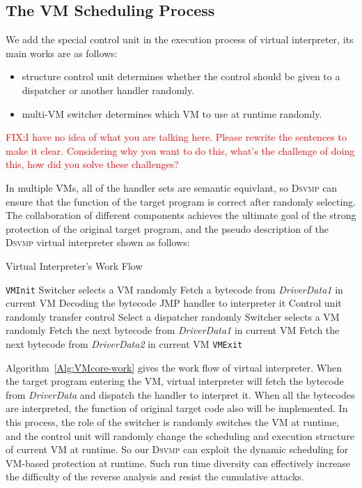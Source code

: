\documentclass[preprint,12pt,3p]{elsarticle}
\newcommand{\DSVMP}{\textsc{Dsvmp}\xspace}
\newcommand\FIXME[1]{\textcolor{red}{FIX:}\textcolor{red}{#1}}
\begin{document}
\subsection{The VM Scheduling Process}\label{sec:mvm-2}
We add the special control unit in the execution process of virtual interpreter, its main works are as follows:
\begin{itemize}
  \item structure control unit determines whether the control should be given to a dispatcher or another handler randomly.
  \item multi-VM switcher determines which VM to use at runtime randomly.
\end{itemize}
\FIXME{I have no idea of what you are talking here. Please rewrite the sentences to make it clear. Considering
why you want to do this, what's the challenge of doing this, how did you solve these challenges?}

In multiple VMs, all of the handler sets are semantic equivlant,
so \DSVMP can ensure that the function of the target program is correct after randomly selecting.
The collaboration of different components achieves the ultimate goal of the strong protection of the original target program,
and the pseudo description of the \DSVMP virtual interpreter shown as follows:

\begin{algorithm}[t!]
\caption{Virtual Interpreter's Work Flow\label{Alg:VMcore-work}}
\begin{algorithmic}[1]
\STATE \texttt{VMInit}
\STATE Switcher selects a VM randomly
\STATE Fetch a bytecode from \emph{DriverData1} in current VM
\STATE Decoding the bytecode
\STATE JMP handler to interpreter it
\STATE Control unit randomly transfer control
\STATE Select a dispatcher randomly
\STATE Switcher selects a VM randomly
\STATE Fetch the next bytecode from \emph{DriverData1} in current VM
\STATE Fetch the next bytecode from \emph{DriverData2} in current VM
\ENDIF
\ENDWHILE
\STATE \texttt{VMExit}
\end{algorithmic}
\end{algorithm}

Algorithm~\ref{Alg:VMcore-work} gives the work flow of virtual interpreter.
When the target program entering the VM, virtual interpreter will fetch the bytecode from \emph{DriverData}
and dispatch the handler to interpret it.
When all the bytecodes are interpreted, the function of original target code also will be implemented.
In this process, the role of the switcher is randomly switches the VM at runtime,
and the control unit will randomly change the scheduling and execution structure of current VM at runtime.
So our \DSVMP can exploit the dynamic scheduling for VM-based protection at runtime.
Such run time diversity can effectively increase the difficulty of the reverse analysis and resist the cumulative attacks.
\end{document}
